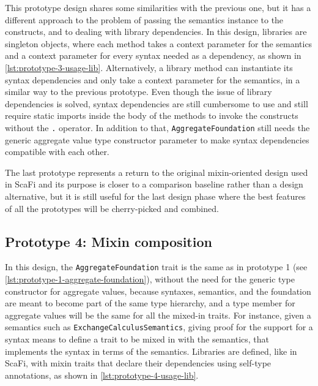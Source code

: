 This prototype design shares some similarities with the previous one, but it has a different approach to the problem of passing the semantics instance to the constructs, and to dealing with library dependencies.
%
In this design, libraries are singleton objects, where each method takes a context parameter for the semantics and a context parameter for every syntax needed as a dependency, as shown in \cref{lst:prototype-3-usage-lib}.
%
Alternatively, a library method can instantiate its syntax dependencies and only take a context parameter for the semantics, in a similar way to the previous prototype.
%
Even though the issue of library dependencies is solved, syntax dependencies are still cumbersome to use and still require static imports inside the body of the methods to invoke the constructs without the \texttt{.} operator.
%
In addition to that, \texttt{AggregateFoundation} still needs the generic aggregate value type constructor parameter to make syntax dependencies compatible with each other.



The last prototype represents a return to the original mixin-oriented design used in ScaFi and its purpose is closer to a comparison baseline rather than a design alternative, but it is still useful for the last design phase where the best features of all the prototypes will be cherry-picked and combined.

\subsection{Prototype 4: Mixin composition} \label{chap:design->sec:dsl->subsec:prototype-4-mixin-composition}

In this design, the \texttt{AggregateFoundation} trait is the same as in prototype 1 (see \cref{lst:prototype-1-aggregate-foundation}), without the need for the generic type constructor for aggregate values, because syntaxes, semantics, and the foundation are meant to become part of the same type hierarchy, and a type member for aggregate values will be the same for all the mixed-in traits.
%
For instance, given a semantics such as \texttt{ExchangeCalculusSemantics}, giving proof for the support for a syntax means to define a trait to be mixed in with the semantics, that implements the syntax in terms of the semantics.
%
Libraries are defined, like in ScaFi, with mixin traits that declare their dependencies using self-type annotations, as shown in \cref{lst:prototype-4-usage-lib}.

